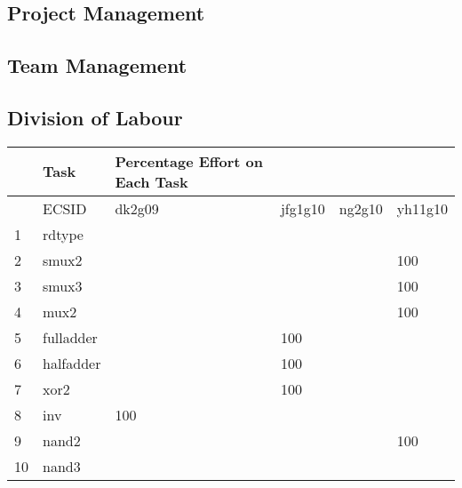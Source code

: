 \documentclass[11pt,a4paper]{article} %
\begin{document}
\newpage
\begin{appendices} 
\section{Project Management} 
 \subsection{Team Management}
\newpage
\subsection{Division of Labour}
\begin{table}
    \begin{tabular}{l|l|l|l|l|l}
    \hline
    ~  & Task                    & Percentage Effort on Each Task & ~       & ~      & ~       \\ \hline
    ~  & ECSID                   & dk2g09                         & jfg1g10 & ng2g10 & yh11g10 \\ \hline
    1  & rdtype                  & ~                              & ~       & ~      & ~       \\ \hline
    2  & smux2                   & ~                              & ~       & ~      & 100     \\ \hline
    3  & smux3                   & ~                              & ~       & ~      & 100     \\ \hline
    4  & mux2                    & ~                              & ~       & ~      & 100     \\ \hline
    5  & fulladder               & ~                              & 100     & ~      & ~       \\ \hline
    6  & halfadder               & ~                              & 100     & ~      & ~       \\ \hline
    7  & xor2                    & ~                              & 100     & ~      & ~       \\ \hline
    8  & inv                     & 100                            & ~       & ~      & ~       \\ \hline
    9  & nand2                   & ~                              & ~       & ~      & 100     \\ \hline
    10 & nand3                   & ~                              & ~       & ~      & ~       \\ \hline

\end{tabular}
\end{table}
\end{appendices}
\end{document}
